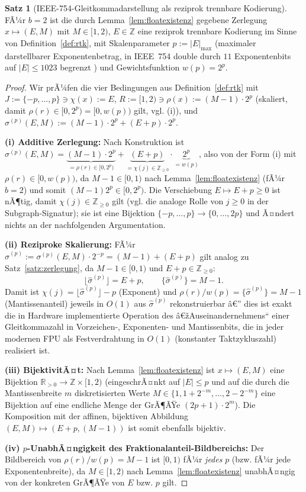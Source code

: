 ﻿\documentclass[a4paper,12pt]{article}
\theoremstyle{definition}
\newtheorem{satz}{Satz}
\begin{document}
\begin{satz}[IEEE-754-Gleitkommadarstellung als reziprok trennbare Kodierung]
\label{satz:ieee_rtk}
	FÃ¼r $b=2$ ist die durch Lemma~\ref{lem:floatexistenz} gegebene
	Zerlegung $x\mapsto(E,M)$ mit $M\in[1,2)$, $E\in\mathbb{Z}$ eine
	reziprok trennbare Kodierung im Sinne von Definition~\ref{def:rtk},
	mit Skalenparameter $p:=|E|_{\max}$ (maximaler darstellbarer
	Exponentenbetrag, in IEEE~754 double durch $11$ Exponentenbits auf
	$|E|\leq1023$ begrenzt \cite{ieee754}) und Gewichtsfunktion
	$w(p)=2^{p}$.
\end{satz}

\begin{proof}
	Wir prÃ¼fen die vier Bedingungen aus Definition~\ref{def:rtk} mit
	$J:=\{-p,\ldots,p\}\ni\chi(x):=E$, $R:=[1,2)\ni\rho(x):=(M-1)\cdot 2^{p}$
	(skaliert, damit $\rho(r)\in[0,2^p)=[0,w(p))$ gilt, vgl. (i)), und
	$\sigma^{(p)}(E,M) := (M-1)\cdot2^p + (E+p)\cdot2^p$.

	\textbf{(i) Additive Zerlegung:} Nach Konstruktion ist
	$\sigma^{(p)}(E,M) = \underbrace{(M-1)\cdot2^p}_{=\rho(r)\in[0,2^p)}
	+ \underbrace{(E+p)}_{=\chi(j)\in\mathbb{Z}_{\geq0}}\cdot\underbrace{2^p}_{=w(p)}$,
	also von der Form (i) mit $\rho(r)\in[0,w(p))$, da $M-1\in[0,1)$ nach
	Lemma~\ref{lem:floatexistenz} (fÃ¼r $b=2$) und somit $(M-1)2^p\in[0,2^p)$.
	Die Verschiebung $E\mapsto E+p\geq0$ ist nÃ¶tig, damit $\chi(j)\in\mathbb{Z}_{\geq0}$
	gilt (vgl. die analoge Rolle von $j\geq0$ in der Subgraph-Signatur);
	sie ist eine Bijektion $\{-p,\ldots,p\}\to\{0,\ldots,2p\}$ und Ã¤ndert
	nichts an der nachfolgenden Argumentation.

	\textbf{(ii) Reziproke Skalierung:} FÃ¼r
	$\hat\sigma^{(p)} := \sigma^{(p)}(E,M)\cdot 2^{-p}
	= (M-1) + (E+p)$ gilt analog zu Satz~\ref{satz:zerlegung}, da
	$M-1\in[0,1)$ und $E+p\in\mathbb{Z}_{\geq0}$:
	\[
		\lfloor\hat\sigma^{(p)}\rfloor = E+p, \qquad
		\{\hat\sigma^{(p)}\} = M-1.
	\]
	Damit ist $\chi(j)=\lfloor\hat\sigma^{(p)}\rfloor-p$ (Exponent) und
	$\rho(r)/w(p) = \{\hat\sigma^{(p)}\}=M-1$ (Mantissenanteil) jeweils in
	$O(1)$ aus $\hat\sigma^{(p)}$ rekonstruierbar â€” dies ist exakt die in
	Hardware implementierte Operation des â€žAuseinandernehmens`` einer
	Gleitkommazahl in Vorzeichen-, Exponenten- und Mantissenbits, die in
	jeder modernen FPU als Festverdrahtung in $O(1)$ (konstanter
	Taktzykluszahl) realisiert ist.

	\textbf{(iii) BijektivitÃ¤t:} Nach Lemma~\ref{lem:floatexistenz} ist
	$x\mapsto(E,M)$ eine Bijektion $\mathbb{R}_{>0}\to\mathbb{Z}\times[1,2)$
	(eingeschrÃ¤nkt auf $|E|\leq p$ und auf die durch die Mantissenbreite
	$m$ diskretisierten Werte $M\in\{1,1+2^{-m},\ldots,2-2^{-m}\}$ eine
	Bijektion auf eine endliche Menge der GrÃ¶ÃŸe $(2p+1)\cdot2^m$). Die
	Komposition mit der affinen, bijektiven Abbildung
	$(E,M)\mapsto(E+p,(M-1))$ ist somit ebenfalls bijektiv.

	\textbf{(iv) $p$-UnabhÃ¤ngigkeit des Fraktionalanteil-Bildbereichs:}
	Der Bildbereich von $\rho(r)/w(p)=M-1$ ist $[0,1)$ fÃ¼r \emph{jedes}
	$p$ (bzw. fÃ¼r jede Exponentenbreite), da $M\in[1,2)$ nach
	Lemma~\ref{lem:floatexistenz} unabhÃ¤ngig von der konkreten GrÃ¶ÃŸe von
	$E$ bzw. $p$ gilt. \qedhere
\end{proof}
\end{document}
